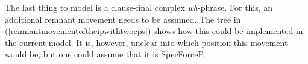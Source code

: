%
%
%
%

The last thing to model is a clause-final complex \textit{wh}-phrase. For this, an additional remnant movement needs to be assumed. The tree in (\ref{remnantmovementoftheipwithtwocps}) shows how this could be implemented in the current model. It is, however, unclear into which position this movement would be, but one could assume that it is SpecForceP. 


